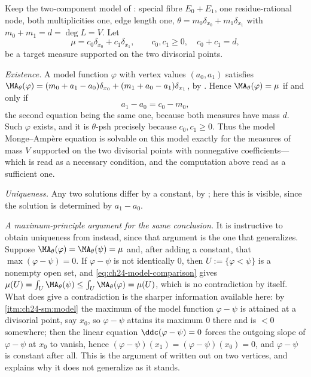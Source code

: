 \begin{example}
\label{ex:ch24-uniqueness-curve}
Keep the two-component model of : special fibre
$E_0+E_1$, one residue-rational node, both multiplicities one, edge
length one,
$\theta=m_0\delta_{x_0}+m_1\delta_{x_1}$ with $m_0+m_1=d=\deg L=V$.
Let
\[
 \mu=c_0\delta_{x_0}+c_1\delta_{x_1},
 \qquad c_0,c_1\geq0,\quad c_0+c_1=d ,
\]
be a target measure supported on the two divisorial points.

\emph{Existence.}  A model function $\varphi$ with vertex values
$(a_0,a_1)$ satisfies
$\MA_\theta(\varphi)=(m_0+a_1-a_0)\delta_{x_0}+(m_1+a_0-a_1)\delta_{x_1}$,
by .  Hence $\MA_\theta(\varphi)=\mu$ if and only
if
\[
 a_1-a_0=c_0-m_0 ,
\]
the second equation being the same one, because both measures have mass
$d$.  Such $\varphi$ exists, and it is $\theta$-psh precisely because
$c_0,c_1\geq0$.  Thus the model Monge--Amp\`ere equation is solvable on
this model exactly for the measures of mass $V$ supported on the two
divisorial points with nonnegative coefficients---which is
 read as a necessary condition, and the computation
above read as a sufficient one.

\emph{Uniqueness.}  Any two solutions differ by a constant, by
; here this is visible, since the
solution is determined by $a_1-a_0$.

\emph{A maximum-principle argument for the same conclusion.}  It is
instructive to obtain uniqueness from
 instead, since that argument is the one
that generalizes.  Suppose $\MA_\theta(\varphi)=\MA_\theta(\psi)=\mu$ and,
after adding a constant, that $\max(\varphi-\psi)=0$.  If
$\varphi-\psi$ is not identically $0$, then
$U:=\{\varphi<\psi\}$ is a nonempty open set, and
\eqref{eq:ch24-model-comparison} gives
$\mu(U)=\int_U\MA_\theta(\psi)\leq\int_U\MA_\theta(\varphi)=\mu(U)$, which
is no contradiction by itself.  What does give a contradiction is the
sharper information available here: by
\,\cref{itm:ch24-sm:model} the maximum of
the model function $\varphi-\psi$ is attained at a divisorial point, say
$x_0$, so $\varphi-\psi$ attains its maximum $0$ there and is
$<0$ somewhere; then the linear equation $\ddc(\varphi-\psi)=0$ forces
the outgoing slope of $\varphi-\psi$ at $x_0$ to vanish, hence
$(\varphi-\psi)(x_1)=(\varphi-\psi)(x_0)=0$, and $\varphi-\psi$ is
constant after all.  This is the argument of
 written out on two vertices, and
 explains why it does not generalize as it
stands.


\end{example}
